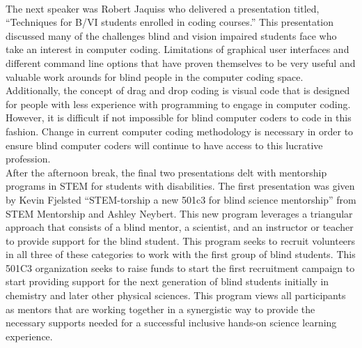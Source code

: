 \documentclass[11pt]{sig-alternate}
\begin{document}
\vspace{2.5 mm}\\The next speaker was Robert Jaquiss who delivered a presentation titled, “Techniques for B/VI students enrolled in coding courses.” This presentation discussed many of the challenges blind and vision impaired students face who take an interest in computer coding. Limitations of graphical user interfaces and different command line options that have proven themselves to be very useful and valuable work arounds for blind people in the computer coding space. Additionally, the concept of drag and drop coding is visual code that is designed for people with less experience with programming to engage in computer coding. However, it is difficult if not impossible for blind computer coders to code in this fashion. Change in current computer coding methodology is necessary in order to ensure blind computer coders will continue to have access to this lucrative profession.
\vspace{2.5 mm}\\After the afternoon break, the final two presentations delt with mentorship programs in STEM for students with disabilities. The first presentation was given by Kevin Fjelsted “STEM-torship a new 501c3 for blind science mentorship” from STEM Mentorship and Ashley Neybert. This new program leverages a triangular approach that consists of a blind mentor, a scientist, and an instructor or teacher to provide support for the blind student. This program seeks to recruit volunteers in all three of these categories to work with the first group of blind students. This 501C3 organization seeks to raise funds to start the first recruitment campaign to start providing support for the next generation of blind students initially in chemistry and later other physical sciences. This program views all participants as mentors that are working together in a synergistic way to provide the necessary supports needed for a successful inclusive hands-on science learning experience.
\end{document}
